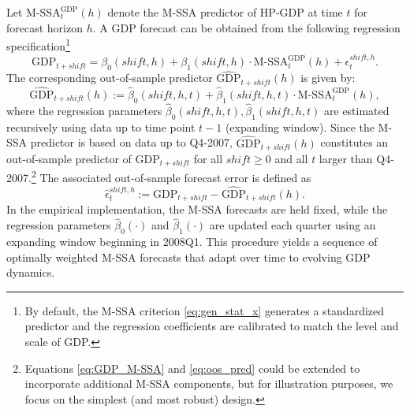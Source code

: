 \documentclass[11pt,a4paper]{article}
\begin{document}
Let $\textrm{M-SSA}^{\textrm{GDP}}_t(h)$ denote the M-SSA predictor of HP-GDP at time $t$ for forecast horizon $h$. A GDP forecast can be obtained from the following regression specification\footnote{By default, the M-SSA criterion \eqref{eq:gen_stat_x} generates a standardized predictor and the regression coefficients are calibrated to match the level and scale of GDP.}
\begin{equation}
\textrm{GDP}_{t+shift}=\beta_0(shift,h)+\beta_1(shift,h) \cdot \textrm{M-SSA}^{\textrm{GDP}}_t(h) + \epsilon_t^{shift,h}.
\label{eq:GDP_M-SSA}
\end{equation}
The corresponding out-of-sample predictor $\widehat{\textrm{GDP}}_{t+shift}(h)$ is given by: 
\begin{equation}\label{eq:oos_pred}
\widehat{\textrm{GDP}}_{t+shift}(h):=\hat{\beta}_0(shift,h,t)+\hat{\beta}_1(shift,h,t) \cdot \textrm{M-SSA}^{\textrm{GDP}}_t(h),
\end{equation}
where the regression parameters $\hat{\beta}_0(shift,h,t),\hat{\beta}_1(shift,h,t)$ are estimated recursively using data up to time point $t-1$ (expanding window). Since the M-SSA predictor is based on data up to Q4-2007, $\widehat{\textrm{GDP}}_{t+shift}(h)$ constitutes an out-of-sample predictor of $\textrm{GDP}_{t+shift}$ for all $shift\geq 0$ and all $t$ larger than Q4-2007.\footnote{Equations \eqref{eq:GDP_M-SSA} and \eqref{eq:oos_pred} could be extended to incorporate additional M-SSA components, but for illustration purposes, we focus on the simplest (and most robust) design.} 
The associated out-of-sample forecast error is defined as
\begin{equation}\label{eq:oosfe}
\hat{\epsilon}_t^{shift,h}:={\textrm{GDP}}_{t+shift}-\widehat{\textrm{GDP}}_{t+shift}(h).
\end{equation}
In the empirical implementation, the M-SSA forecasts are held fixed, while the regression parameters $\hat{\beta}_0(\cdot)$ and $\hat{\beta}_1(\cdot)$ are updated each quarter using an expanding window beginning in 2008Q1. This procedure yields a sequence of optimally weighted M-SSA forecasts that adapt over time to evolving GDP dynamics.
\end{document}
